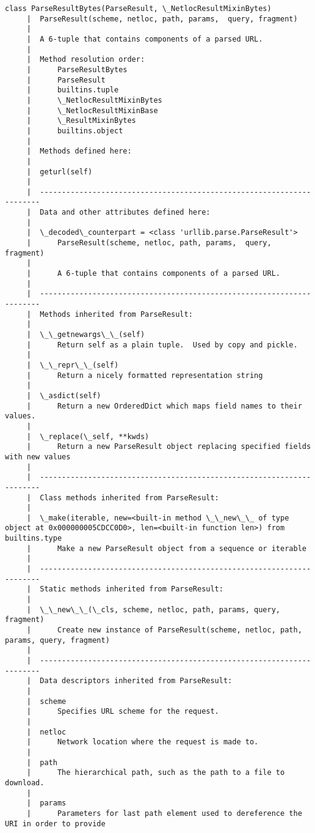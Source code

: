 \documentclass[11pt]{article}
\begin{document}
\begin{Verbatim}[commandchars=\\\{\}]
    class ParseResultBytes(ParseResult, \_NetlocResultMixinBytes)
     |  ParseResult(scheme, netloc, path, params,  query, fragment)
     |  
     |  A 6-tuple that contains components of a parsed URL.
     |  
     |  Method resolution order:
     |      ParseResultBytes
     |      ParseResult
     |      builtins.tuple
     |      \_NetlocResultMixinBytes
     |      \_NetlocResultMixinBase
     |      \_ResultMixinBytes
     |      builtins.object
     |  
     |  Methods defined here:
     |  
     |  geturl(self)
     |  
     |  ----------------------------------------------------------------------
     |  Data and other attributes defined here:
     |  
     |  \_decoded\_counterpart = <class 'urllib.parse.ParseResult'>
     |      ParseResult(scheme, netloc, path, params,  query, fragment)
     |      
     |      A 6-tuple that contains components of a parsed URL.
     |  
     |  ----------------------------------------------------------------------
     |  Methods inherited from ParseResult:
     |  
     |  \_\_getnewargs\_\_(self)
     |      Return self as a plain tuple.  Used by copy and pickle.
     |  
     |  \_\_repr\_\_(self)
     |      Return a nicely formatted representation string
     |  
     |  \_asdict(self)
     |      Return a new OrderedDict which maps field names to their values.
     |  
     |  \_replace(\_self, **kwds)
     |      Return a new ParseResult object replacing specified fields with new values
     |  
     |  ----------------------------------------------------------------------
     |  Class methods inherited from ParseResult:
     |  
     |  \_make(iterable, new=<built-in method \_\_new\_\_ of type object at 0x000000005CDCC0D0>, len=<built-in function len>) from builtins.type
     |      Make a new ParseResult object from a sequence or iterable
     |  
     |  ----------------------------------------------------------------------
     |  Static methods inherited from ParseResult:
     |  
     |  \_\_new\_\_(\_cls, scheme, netloc, path, params, query, fragment)
     |      Create new instance of ParseResult(scheme, netloc, path, params, query, fragment)
     |  
     |  ----------------------------------------------------------------------
     |  Data descriptors inherited from ParseResult:
     |  
     |  scheme
     |      Specifies URL scheme for the request.
     |  
     |  netloc
     |      Network location where the request is made to.
     |  
     |  path
     |      The hierarchical path, such as the path to a file to download.
     |  
     |  params
     |      Parameters for last path element used to dereference the URI in order to provide

\end{Verbatim}
\end{document}
